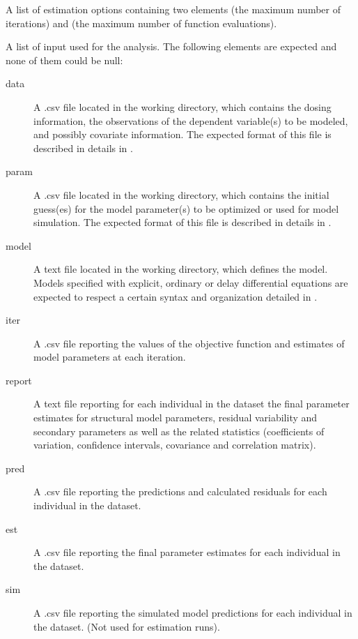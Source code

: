 \begin{Arguments}
\begin{ldescription}
\begin{description}
\end{description}


\item[\code{estim.options}] A list of estimation options containing two elements
 (the maximum number of iterations) and  (the
maximum number of function evaluations).

\item[\code{files}] A list of input used for the analysis. The following elements are
expected and none of them could be null: \begin{description}

\item[data] A .csv file located in the working directory, which contains
the dosing information, the observations of the dependent variable(s)
to be modeled, and possibly covariate information. The expected format 
of this file is described in details in .
\item[param] A .csv file located in the working directory, which contains
the initial guess(es) for the model parameter(s) to be optimized or used
for model simulation. The expected format of this file is described in
details in .
\item[model] A text file located in the working directory, which defines 
the model. Models specified with explicit, ordinary or delay 
differential equations are expected to respect a certain syntax and 
organization detailed in .
\item[iter] A .csv file reporting the values of the objective function
and estimates of model parameters at each iteration.
\item[report] A text file reporting for each individual in the dataset the
final parameter estimates for structural model parameters, residual 
variability and secondary parameters as well as the related statistics 
(coefficients of variation, confidence intervals, covariance and 
correlation matrix).
\item[pred] A .csv file reporting the predictions and calculated residuals
for each individual in the dataset.
\item[est] A .csv file reporting the final parameter estimates for each
individual in the dataset.
\item[sim] A .csv file reporting the simulated model predictions for each 
individual in the dataset. (Not used for estimation runs).

\end{description}


\end{ldescription}
\end{Arguments}
